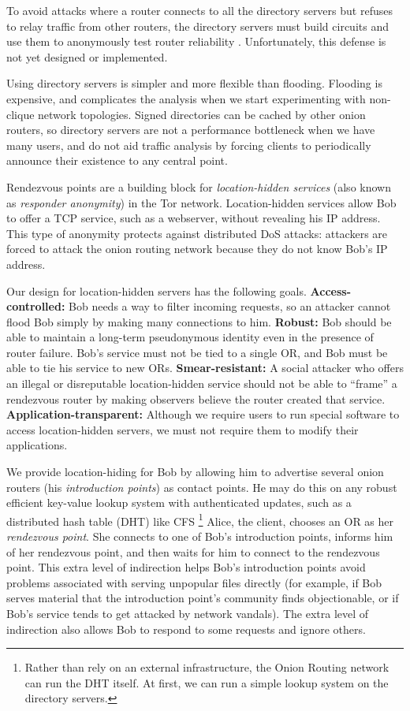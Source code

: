 \documentclass[times,10pt,twocolumn]{article}
\begin{document}
To avoid attacks where a router connects to all the directory servers
but refuses to relay traffic from other routers, the directory servers
must build circuits and use them to anonymously test router reliability
\cite{mix-acc}. Unfortunately, this defense is not yet designed or
implemented.

Using directory servers is simpler and more flexible than flooding.
Flooding is expensive, and complicates the analysis when we
start experimenting with non-clique network topologies. Signed
directories can be cached by other
onion routers,
so directory servers are not a performance
bottleneck when we have many users, and do not aid traffic analysis by
forcing clients to periodically announce their existence to any
central point.

\label{sec:rendezvous}

Rendezvous points are a building block for \emph{location-hidden
services} (also known as \emph{responder anonymity}) in the Tor
network.  Location-hidden services allow Bob to offer a TCP
service, such as a webserver, without revealing his IP address.
This type of anonymity protects against distributed DoS attacks:
attackers are forced to attack the onion routing network
because they do not know Bob's IP address.

Our design for location-hidden servers has the following goals.
\textbf{Access-controlled:} Bob needs a way to filter incoming requests,
so an attacker cannot flood Bob simply by making many connections to him.
\textbf{Robust:} Bob should be able to maintain a long-term pseudonymous
identity even in the presence of router failure. Bob's service must
not be tied to a single OR, and Bob must be able to tie his service
to new ORs. \textbf{Smear-resistant:}
A social attacker who offers an illegal or disreputable location-hidden
service should not be able to ``frame'' a rendezvous router by
making observers believe the router created that service.
\textbf{Application-transparent:} Although we require users
to run special software to access location-hidden servers, we must not
require them to modify their applications.

We provide location-hiding for Bob by allowing him to advertise
several onion routers (his \emph{introduction points}) as contact
points. He may do this on any robust efficient
key-value lookup system with authenticated updates, such as a
distributed hash table (DHT) like CFS \cite{cfs:sosp01}\footnote{
Rather than rely on an external infrastructure, the Onion Routing network
can run the DHT itself.  At first, we can run a simple lookup
system on the
directory servers.} Alice, the client, chooses an OR as her
\emph{rendezvous point}. She connects to one of Bob's introduction
points, informs him of her rendezvous point, and then waits for him
to connect to the rendezvous point. This extra level of indirection
helps Bob's introduction points avoid problems associated with serving
unpopular files directly (for example, if Bob serves
material that the introduction point's community finds objectionable,
or if Bob's service tends to get attacked by network vandals).
The extra level of indirection also allows Bob to respond to some requests
and ignore others.
\end{document}
